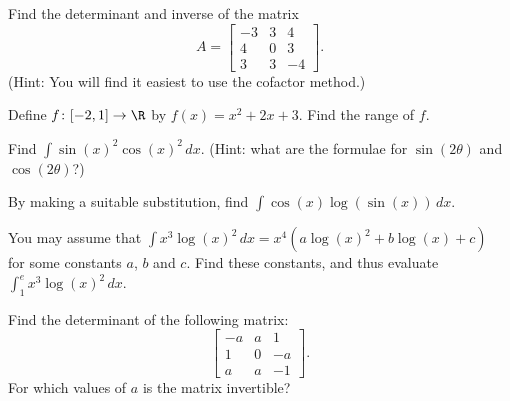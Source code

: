 \documentclass[12pt,twoside]{shefexam}
\newcommand{\xra}       {\rightarrow}
\renewcommand{\:}{\colon}
\begin{document}
 \question %
  Find the determinant and inverse of the matrix 
  \[ A=
     \left[\begin{array}{ccc}
      -3 & 3 & 4 \\ 4 & 0 & 3 \\ 3 & 3 & -4 
     \end{array}\right].
  \]
  (Hint: You will find it easiest to use the cofactor method.)
 
\setcounter{enumi}{0}
\gdef\theenumi{\textbf{\sectionstyle{secnum}\arabic{enumi}}}%
\gdef\thequestion{\sectionstyle{secnum}\arabic{enumi}}%

 \question %
  Define $f\:[-2,1]\xra{}\R$ by $f(x)=x^2+2x+3$.  Find the range of $f$.

 \question %
  Find $\int\sin(x)^2\cos(x)^2\,dx$.  (Hint: what are the formulae for
  $\sin(2\theta)$ and $\cos(2\theta)$?)

 \question %
  By making a suitable substitution, find
  $\int\cos(x)\log(\sin(x))\,dx$.

 \question %
  You may assume that
  $\displaystyle \int x^3 \log(x)^2\,dx = x^4(a\log(x)^2 + b\log(x) + c)$\\
  for some constants $a$, $b$ and $c$.  Find these constants, and thus
  evaluate $\int_1^e x^3\log(x)^2\, dx$.

 \question %
  Find the determinant of the following matrix:
  \[ \left[\begin{array}{cccc}
      -a & a & 1 \\
      1 & 0 & -a \\
      a & a & -1
     \end{array}\right].
  \]
  For which values of $a$ is the matrix invertible?
\endpaper
\end{document}
